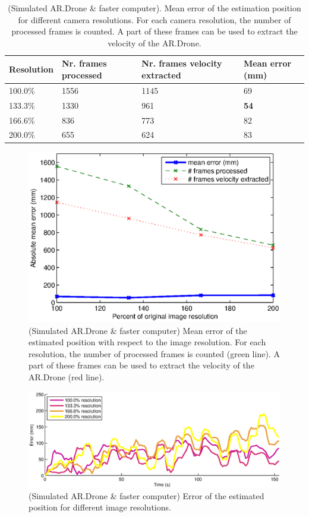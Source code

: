 \begin{table}[htb!]
    \centering
    \begin{tabular}
        { | l | l | l | l | } 
	\hline
	Resolution & Nr. frames processed & Nr. frames velocity extracted & Mean error (mm) \\
        \hline
	100.0\% & 1556 & 1145 & 69 \\
	133.3\% & 1330 & 961 & \textbf{54} \\
	166.6\% & 836 & 773 & 82 \\
	200.0\% & 655 & 624 & 83 \\
	\hline
    \end{tabular}
    \caption{(Simulated AR.Drone \& faster computer). Mean error of the estimation position for different camera resolutions. For each camera resolution, the number of processed frames is counted. A part of these frames can be used to extract the velocity of the AR.Drone.}
    \label{tab:res-resolution-usar-pcudk}
\end{table}


\begin{figure}[htb!]
\centering
\includegraphics[width=0.55\linewidth]{images/exp3-us-pcudk2.eps}
\caption{(Simulated AR.Drone \& faster computer) Mean error of the estimated position with respect to the image resolution. For each resolution, the number of processed frames is counted (green line). A part of these frames can be used to extract the velocity of the AR.Drone (red line).}
\label{fig:exp3-pcudk-res-error}
\end{figure}

\begin{figure}[htb!]
\centering
\includegraphics[width=0.9\linewidth]{images/exp3-us-pcudk.eps}
\caption{(Simulated AR.Drone \& faster computer) Error of the estimated position for different image resolutions.}
\label{fig:exp3-pcudk-res-error2}
\end{figure}







